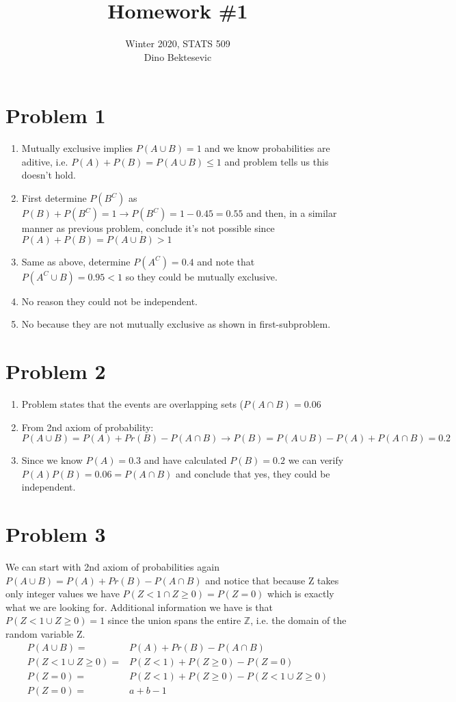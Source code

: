 \documentclass{article}
\date{{}}
\newcommand{\1}{\mathbf{1}}
\newcommand{\Z}{\mathbb{Z}}
\begin{document}
\title{Homework \#1}
\author{\normalsize{Winter 2020, STATS 509}\\
\normalsize{Dino Bektesevic}}
\maketitle

\section*{Problem 1}
\begin{enumerate}
	\item Mutually exclusive implies $P(A\cup B)=1$ and we know probabilities are aditive, i.e. $P(A)+P(B)=P(A\cup B)\leq 1$ and problem tells us this doesn't hold.
	\item First determine $P(B^C)$ as $P(B)+P(B^C)=1 \rightarrow P(B^C)=1-0.45=0.55$ and then, in a similar manner as previous problem, conclude it's not possible since  $P(A)+P(B)=P(A\cup B) > 1$
	\item Same as above, determine $P(A^C)=0.4$ and note that $P(A^C\cup B)=0.95<1$ so they could be mutually exclusive.
	\item No reason they could not be independent. 
	\item No because they are not mutually exclusive as shown in first-subproblem.
\end{enumerate}

\section*{Problem 2}
\begin{enumerate}
	\item Problem states that the events are overlapping sets ($P(A\cap B) =0.06$
	\item From 2nd axiom of probability: $P(A\cup B) = P(A) + Pr(B) - P(A\cap B) \rightarrow P(B) = P(A\cup B)  - P(A) + P(A\cap B) = 0.2$
	\item Since we know $P(A)=0.3$ and have calculated $P(B)=0.2$ we can verify $P(A)P(B)=0.06=P(A\cap B)$ and conclude that yes, they could be independent.
\end{enumerate}


\section*{Problem 3}
We can start with 2nd axiom of probabilities again $P(A\cup B) = P(A) + Pr(B) - P(A\cap B)$ and notice that because Z takes only integer values we have $P(Z<1 \cap Z\geq 0) = P(Z=0)$ which is exactly what we are looking for. Additional information we have is that $P(Z<1 \cup Z\geq 0) = 1$ since the union spans the entire $\Z$, i.e. the domain of the random variable Z.
\begin{align*}
P(A\cup B) =& P(A) + Pr(B) - P(A\cap B) \\
P(Z<1 \cup Z\geq 0) =& P(Z<1) + P(Z\geq 0) - P(Z=0) \\
P(Z=0) =& P(Z<1) + P(Z\geq 0) - P(Z<1 \cup Z\geq 0) \\
P(Z=0) =& a + b - 1
\end{align*}
\end{document}
